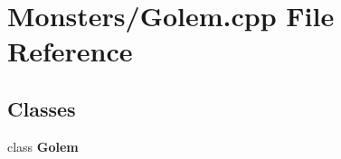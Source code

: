 \section{Monsters/\-Golem.cpp File Reference}
\label{_golem_8cpp}
\subsection*{Classes}
\begin{DoxyCompactItemize}
\item 
class {\bf Golem}
\end{DoxyCompactItemize}
